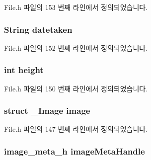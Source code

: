 File.\-h 파일의 153 번째 라인에서 정의되었습니다.

\hypertarget{struct___image_extends_a077fc46f97fd76e21ef941afe99e6eaa}{
\subsubsection[{datetaken}]{\setlength{\rightskip}{0pt plus 5cm}String datetaken}}\label{struct___image_extends_a077fc46f97fd76e21ef941afe99e6eaa}


File.\-h 파일의 152 번째 라인에서 정의되었습니다.

\hypertarget{struct___image_extends_ad12fc34ce789bce6c8a05d8a17138534}{
\subsubsection[{height}]{\setlength{\rightskip}{0pt plus 5cm}int height}}\label{struct___image_extends_ad12fc34ce789bce6c8a05d8a17138534}


File.\-h 파일의 150 번째 라인에서 정의되었습니다.

\hypertarget{struct___image_extends_a24c96542e7d59186d5d414503928920a}{
\subsubsection[{image}]{\setlength{\rightskip}{0pt plus 5cm}struct {\bf \-\_\-\-Image} image}}\label{struct___image_extends_a24c96542e7d59186d5d414503928920a}


File.\-h 파일의 147 번째 라인에서 정의되었습니다.

\hypertarget{struct___image_extends_a9cb994692e8daaf094623152f5f88d53}{
\subsubsection[{image\-Meta\-Handle}]{\setlength{\rightskip}{0pt plus 5cm}image\-\_\-meta\-\_\-h image\-Meta\-Handle}}\label{struct___image_extends_a9cb994692e8daaf094623152f5f88d53}


